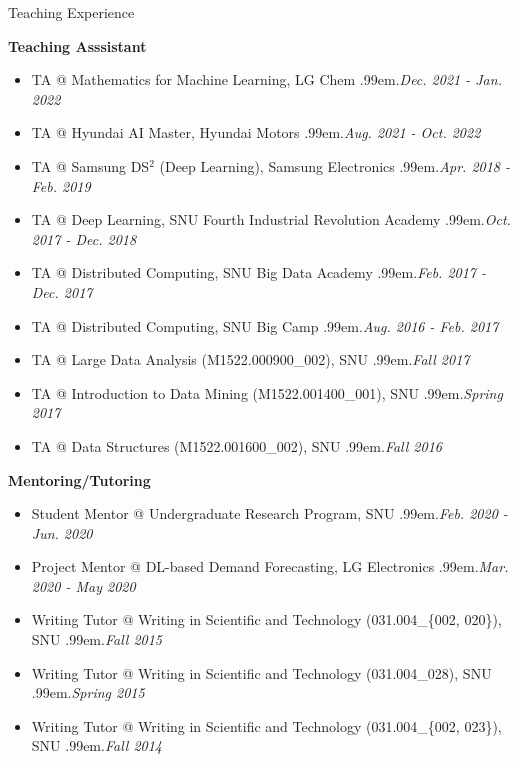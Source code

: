 \documentclass{resume} %
\makeatletter
\newcommand \Dotfill {\leavevmode \cleaders \hb@xt@ .99em{\hss .\hss }\hfill \kern \z@}
\makeatother
\begin{document}

\begin{rSection}{Teaching Experience}

\textbf{Teaching Asssistant}
\begin{itemize}[noitemsep]
	\item TA @ Mathematics for Machine Learning, LG Chem \smallskip \Dotfill \emph{Dec. 2021 - Jan. 2022}
	\item TA @ Hyundai AI Master, Hyundai Motors \smallskip \Dotfill \emph{Aug. 2021 - Oct. 2022}
	\item TA @ Samsung DS$^2$ (Deep Learning), Samsung Electronics \smallskip \Dotfill \emph{Apr. 2018 - Feb. 2019}
	\item TA @ Deep Learning, SNU Fourth Industrial Revolution Academy \smallskip \Dotfill \emph{Oct. 2017 - Dec. 2018}
	\item TA @ Distributed Computing, SNU Big Data Academy \smallskip \Dotfill \emph{Feb. 2017 - Dec. 2017}
	\item TA @ Distributed Computing, SNU Big Camp \smallskip \Dotfill \emph{Aug. 2016 - Feb. 2017}
	\item TA @ Large Data Analysis (M1522.000900\_002), SNU \smallskip \Dotfill \emph{Fall 2017}
	\item TA @ Introduction to Data Mining (M1522.001400\_001), SNU \smallskip \Dotfill \emph{Spring 2017}
	\item TA @ Data Structures (M1522.001600\_002), SNU \smallskip \Dotfill \emph{Fall 2016}
\end{itemize}

\textbf{Mentoring/Tutoring}
\begin{itemize}[noitemsep]
	\item Student Mentor @ Undergraduate Research Program, SNU \smallskip \Dotfill \emph{Feb. 2020 - Jun. 2020}
	\item Project Mentor @ DL-based Demand Forecasting, LG Electronics \smallskip \Dotfill \emph{Mar. 2020 - May 2020}
	\item Writing Tutor @ Writing in Scientific and Technology (031.004\_\{002, 020\}), SNU \smallskip \Dotfill \emph{Fall 2015}
	\item Writing Tutor @ Writing in Scientific and Technology (031.004\_028), SNU \smallskip \Dotfill \emph{Spring 2015}
	\item Writing Tutor @ Writing in Scientific and Technology (031.004\_\{002, 023\}), SNU \smallskip \Dotfill \emph{Fall 2014}
\end{itemize}

\end{rSection}
\end{document}
